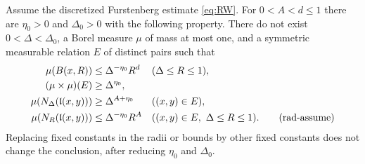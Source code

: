 \begin{lemma}\label{names:radial-finite}
Assume the discretized Furstenberg estimate \eqref{eq:RW}.
For $0<A<d\leq1$ there are $\eta_0>0$ and
$\Delta_0>0$ with the following property.  There do not exist
$0<\Delta<\Delta_0$, a Borel measure $\mu$ of mass at most one,
and a symmetric measurable relation $E$ of distinct pairs such that
\begin{align}
 \mu(B(x,R))&\leq \Delta^{-\eta_0}R^d
       &&(\Delta\leq R\leq1),\label{names:radial-ball}\\
 (\mu\times\mu)(E)&\geq\Delta^{\eta_0},\label{names:radial-density}\\
 \mu(N_\Delta(\mathfrak l(x,y)))&\geq\Delta^{A+\eta_0}
       &&((x,y)\in E),\notag\\
 \mu(N_R(\mathfrak l(x,y)))&\leq\Delta^{-\eta_0}R^A
       &&((x,y)\in E,\ \Delta\leq R\leq1).
 \tag{rad-assume}\label{eq:rad-assume}
\end{align}
Replacing fixed constants in the radii or bounds by other fixed
constants does not change the conclusion, after reducing $\eta_0$
and $\Delta_0$.
\end{lemma}

